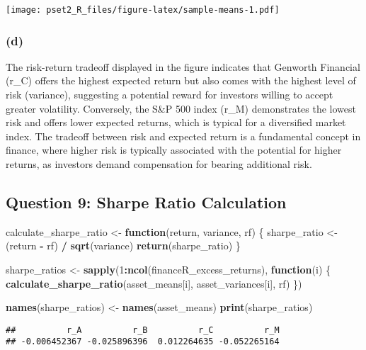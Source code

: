 \documentclass[
]{article}
\newenvironment{Shaded}{\begin{snugshade}}{\end{snugshade}}
\newcommand{\ControlFlowTok}[1]{\textcolor[rgb]{0.13,0.29,0.53}{\textbf{#1}}}
\newcommand{\DecValTok}[1]{\textcolor[rgb]{0.00,0.00,0.81}{#1}}
\newcommand{\FunctionTok}[1]{\textcolor[rgb]{0.13,0.29,0.53}{\textbf{#1}}}
\newcommand{\NormalTok}[1]{#1}
\newcommand{\OtherTok}[1]{\textcolor[rgb]{0.56,0.35,0.01}{#1}}
\newcommand{\SpecialCharTok}[1]{\textcolor[rgb]{0.81,0.36,0.00}{\textbf{#1}}}
\begin{document}
\texttt{[image: pset2\_R\_files/figure-latex/sample-means-1.pdf]}

\hypertarget{d}{%
\subsubsection{(d)}\label{d}}

The risk-return tradeoff displayed in the figure indicates that Genworth
Financial (r\_C) offers the highest expected return but also comes with
the highest level of risk (variance), suggesting a potential reward for
investors willing to accept greater volatility. Conversely, the S\&P 500
index (r\_M) demonstrates the lowest risk and offers lower expected
returns, which is typical for a diversified market index. The tradeoff
between risk and expected return is a fundamental concept in finance,
where higher risk is typically associated with the potential for higher
returns, as investors demand compensation for bearing additional risk.

\hypertarget{question-9-sharpe-ratio-calculation}{%
\subsection{Question 9: Sharpe Ratio
Calculation}\label{question-9-sharpe-ratio-calculation}}

\begin{Shaded}
\begin{Highlighting}[]
\NormalTok{calculate\_sharpe\_ratio }\OtherTok{\textless{}{-}} \ControlFlowTok{function}\NormalTok{(return, variance, rf) \{}
\NormalTok{  sharpe\_ratio }\OtherTok{\textless{}{-}}\NormalTok{ (return }\SpecialCharTok{{-}}\NormalTok{ rf) }\SpecialCharTok{/} \FunctionTok{sqrt}\NormalTok{(variance)}
  \FunctionTok{return}\NormalTok{(sharpe\_ratio)}
\NormalTok{\}}

\NormalTok{sharpe\_ratios }\OtherTok{\textless{}{-}} \FunctionTok{sapply}\NormalTok{(}\DecValTok{1}\SpecialCharTok{:}\FunctionTok{ncol}\NormalTok{(financeR\_excess\_returns), }\ControlFlowTok{function}\NormalTok{(i) \{}
  \FunctionTok{calculate\_sharpe\_ratio}\NormalTok{(asset\_means[i], asset\_variances[i], rf)}
\NormalTok{\})}

\FunctionTok{names}\NormalTok{(sharpe\_ratios) }\OtherTok{\textless{}{-}} \FunctionTok{names}\NormalTok{(asset\_means)}
\FunctionTok{print}\NormalTok{(sharpe\_ratios)}
\end{Highlighting}
\end{Shaded}

\begin{verbatim}
##          r_A          r_B          r_C          r_M 
## -0.006452367 -0.025896396  0.012264635 -0.052265164
\end{verbatim}
\end{document}
